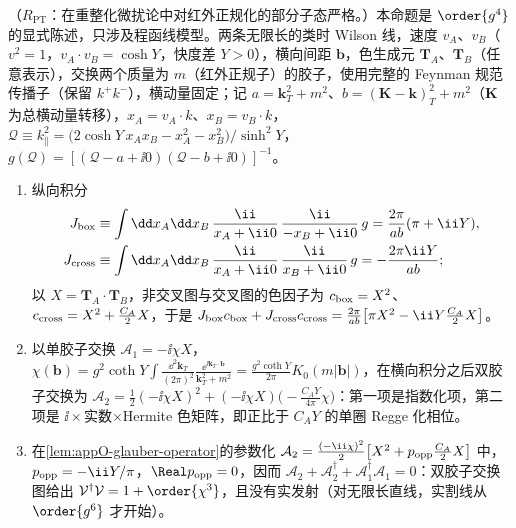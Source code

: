 \begin{proposition}\label{prop:dy-eikonal-twogluon}
（$R_{\mathrm{PT}}$：在重整化微扰论中对红外正规化的部分子态严格。）本命题是 $\order{g^4}$ 的显式陈述，只涉及程函线模型。两条无限长的类时 Wilson 线，速度 $v_A$、$v_B$（$v^2=1$，$v_A\cdot v_B=\cosh Y$，快度差 $Y>0$），横向间距 $\boldsymbol b$，色生成元 $\mathbf T_A$、$\mathbf T_B$（任意表示），交换两个质量为 $m$（红外正规子）的胶子，使用完整的 Feynman 规范传播子（保留 $k^+k^-$），横动量固定；记 $a=\mathbf k_T^2+m^2$、$b=(\mathbf K-\mathbf k)_T^2+m^2$（$\mathbf K$ 为总横动量转移），$x_A=v_A\cdot k$、$x_B=v_B\cdot k$，$\mathcal Q\equiv k_\parallel^2=\big(2\cosh Y\,x_Ax_B-x_A^2-x_B^2\big)/\sinh^2Y$，$g(\mathcal Q)=[(\mathcal Q-a+\ii0)(\mathcal Q-b+\ii0)]^{-1}$。
\begin{enumerate}[label=(\alph*),leftmargin=2.2em,itemsep=1pt,topsep=2pt]
\item 纵向积分
\begin{equation}\label{eq:dy-Jbox}
\begin{aligned}
J_{\rm box}&\equiv\int\dd x_A\dd x_B\,\frac{\ii}{x_A+\ii0}\,\frac{\ii}{-x_B+\ii0}\,g=\frac{2\pi}{ab}(\pi+\ii Y),\\
J_{\rm cross}&\equiv\int\dd x_A\dd x_B\,\frac{\ii}{x_A+\ii0}\,\frac{\ii}{x_B+\ii0}\,g=-\frac{2\pi\ii Y}{ab};
\end{aligned}
\end{equation}
以 $X=\mathbf T_A\cdot\mathbf T_B$，非交叉图与交叉图的色因子为 $c_{\rm box}=X^2$、$c_{\rm cross}=X^2+\frac{C_A}2X$，于是
$J_{\rm box}c_{\rm box}+J_{\rm cross}c_{\rm cross}=\frac{2\pi}{ab}\big[\pi X^2-\ii Y\frac{C_A}2X\big]$。
\item 以单胶子交换 $\mathcal A_1=-\ii\chi X$，$\chi(\boldsymbol b)=g^2\coth Y\int\frac{\dd^2\mathbf k_T}{(2\pi)^2}\frac{\ee^{\ii\mathbf k_T\cdot\boldsymbol b}}{\mathbf k_T^2+m^2}=\frac{g^2\coth Y}{2\pi}K_0(m|\boldsymbol b|)$，在横向积分之后双胶子交换为
$\mathcal A_2=\frac12(-\ii\chi X)^2+(-\ii\chi X)\big(-\frac{C_AY}{4\pi}\chi\big)$：第一项是指数化项，第二项是 $\ii\times$实数$\times$Hermite 色矩阵，即正比于 $C_AY$ 的单圈 Regge 化相位。
\item 在\cref{lem:appO-glauber-operator}的参数化 $\mathcal A_2=\frac{(-\ii\chi)^2}{2}\big[X^2+p_{\rm opp}\frac{C_A}2X\big]$ 中，$p_{\rm opp}=-\ii Y/\pi$，$\Real p_{\rm opp}=0$，因而 $\mathcal A_2+\mathcal A_2^\dagger+\mathcal A_1^\dagger\mathcal A_1=0$：双胶子交换图给出 $\mathcal V^\dagger\mathcal V=1+\order{\chi^3}$，且没有实发射（对无限长直线，实割线从 $\order{g^6}$ 才开始）。
\end{enumerate}
\end{proposition}

